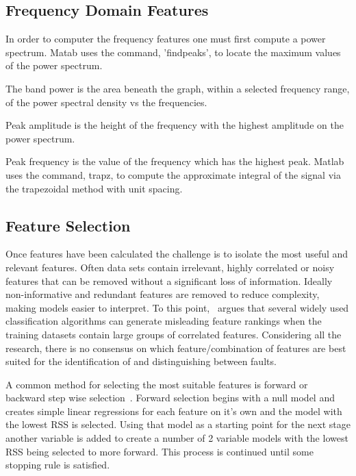 \documentclass[]{article}
\begin{document}
\subsection{Frequency Domain Features}
In order to computer the frequency features one must first compute a power spectrum. Matab uses the command, 'findpeaks', to locate the maximum values of the power spectrum.

The band power is the area beneath the graph, within a selected frequency range, of the power spectral density vs the frequencies.

Peak amplitude is the height of the frequency with the highest amplitude on the power spectrum.

Peak frequency is the value of the frequency which has the highest peak. Matlab uses the command, trapz, to compute the approximate integral of the signal via the trapezoidal method with unit spacing.

%
        
\subsection{Feature Selection}
Once features have been calculated the challenge is to isolate the most useful and relevant features. Often data sets contain irrelevant, highly correlated or noisy features that can be removed without a significant loss of information. Ideally non-informative and redundant features are removed to reduce complexity, making models easier to interpret. To this point,~\cite{tolocsi2011classification} argues that several widely used classification algorithms can generate misleading feature rankings when the training datasets contain large groups of correlated features. Considering all the research, there is no consensus on which feature/combination of features are best suited for the identification of and distinguishing between faults. 

A common method for selecting the most suitable features is forward or backward step wise selection~\cite{james2013introduction}. Forward selection begins with a null model and creates simple linear regressions for each feature on it's own and the model with the lowest RSS is selected. Using that model as a starting point for the next stage another variable is added to create a number of 2 variable models with the lowest RSS being selected to more forward. This process is continued until some stopping rule is satisfied.
\end{document}
